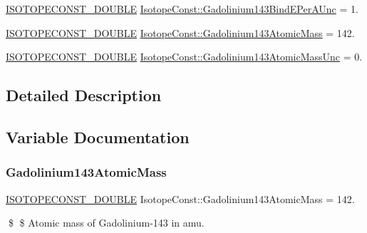 \begin{DoxyCompactItemize}
\item 
\mbox{\hyperlink{group___isotope_const-_macros_ga8f45a7272ce02c0b4c65c44636ed719a}{I\+S\+O\+T\+O\+P\+E\+C\+O\+N\+S\+T\+\_\+\+D\+O\+U\+B\+LE}} \mbox{\hyperlink{group___isotope_const-_gadolinium-_gd143_ga627a7bc832205c9c8adc15ce12e1e981}{Isotope\+Const\+::\+Gadolinium143\+Bind\+E\+Per\+A\+Unc}} = 1.
\item 
\mbox{\hyperlink{group___isotope_const-_macros_ga8f45a7272ce02c0b4c65c44636ed719a}{I\+S\+O\+T\+O\+P\+E\+C\+O\+N\+S\+T\+\_\+\+D\+O\+U\+B\+LE}} \mbox{\hyperlink{group___isotope_const-_gadolinium-_gd143_ga68c1d33870d3d18289e7387d4d7dea7f}{Isotope\+Const\+::\+Gadolinium143\+Atomic\+Mass}} = 142.
\item 
\mbox{\hyperlink{group___isotope_const-_macros_ga8f45a7272ce02c0b4c65c44636ed719a}{I\+S\+O\+T\+O\+P\+E\+C\+O\+N\+S\+T\+\_\+\+D\+O\+U\+B\+LE}} \mbox{\hyperlink{group___isotope_const-_gadolinium-_gd143_ga434a998f20fbac7456b8c2124654a9b2}{Isotope\+Const\+::\+Gadolinium143\+Atomic\+Mass\+Unc}} = 0.
\end{DoxyCompactItemize}


\subsection{Detailed Description}


\subsection{Variable Documentation}
\mbox{\label{group___isotope_const-_gadolinium-_gd143_ga68c1d33870d3d18289e7387d4d7dea7f}} 
\subsubsection{\texorpdfstring{Gadolinium143\+Atomic\+Mass}{Gadolinium143AtomicMass}}
{\footnotesize\ttfamily \mbox{\hyperlink{group___isotope_const-_macros_ga8f45a7272ce02c0b4c65c44636ed719a}{I\+S\+O\+T\+O\+P\+E\+C\+O\+N\+S\+T\+\_\+\+D\+O\+U\+B\+LE}} Isotope\+Const\+::\+Gadolinium143\+Atomic\+Mass = 142.}

\$ \$ Atomic mass of Gadolinium-\/143 in amu. \mbox{\label{group___isotope_const-_gadolinium-_gd143_ga434a998f20fbac7456b8c2124654a9b2}} 
